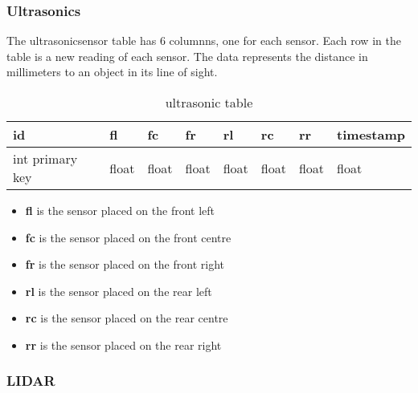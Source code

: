 \subsubsection{Ultrasonics}
The \gls{ultrasonicsensor} table has 6 columnns, one for each sensor. Each row in the table is a new reading of each sensor. The data represents the distance in millimeters to an object in its line of sight.
\begin{table}[!htb]
\centering
\caption{ultrasonic table}
\label{tab:db-ultrasonics}
\begin{tabular}{@{}llllllll@{}}
\toprule
id              & fl    & fc    & fr    & rl    & rc    & rr    & timestamp \\ \midrule
int primary key & float & float & float & float & float & float & float
\end{tabular}
\end{table}
\begin{itemize}
\item{\textbf{fl}} is the sensor placed on the front left
\item{\textbf{fc}} is the sensor placed on the front centre 
\item{\textbf{fr}} is the sensor placed on the front right
\item{\textbf{rl}} is the sensor placed on the rear left 
\item{\textbf{rc}} is the sensor placed on the rear centre
\item{\textbf{rr}} is the sensor placed on the rear right 
\end{itemize}

\subsubsection{LIDAR}
\iffalse
\gls{LIDAR} data read using SDK (C++)
Changed the output to return a JSON format
Python dictionary in this format...
Small error with the last comma breaking the JSON object so used python \lstinline{data.replace(',\n' , ']')} which replaced the last comma with a ]

Lidar class validates the data
 - removes data (angle) which is obscured by the antenna
\fi



